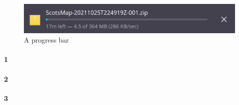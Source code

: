 \documentclass[a4paper,12pt]{article}
\begin{document}
\begin{figure}[h!]
 \centering
 \includegraphics[scale=0.35]{progress.png}
 \caption{A progress bar}
\end{figure}



\newpage

\paragraph{1}
\paragraph{2}
\paragraph{3}
\end{document}
